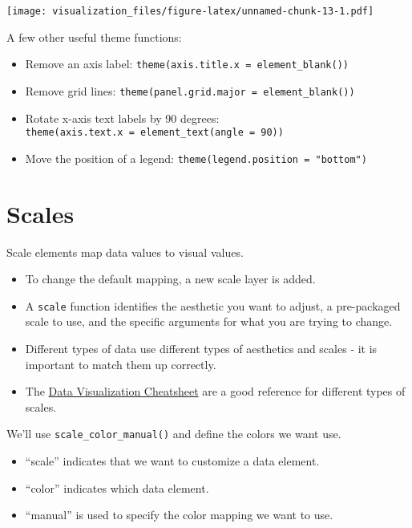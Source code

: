 \documentclass[oneside]{memoir}
\theoremstyle{definition}
\theoremstyle{definition}
\theoremstyle{definition}
\theoremstyle{remark}
\begin{document}
\texttt{[image: visualization\_files/figure-latex/unnamed-chunk-13-1.pdf]}

A few other useful theme functions:

\begin{itemize}
\item
  Remove an axis label:
  \texttt{theme(axis.title.x\ =\ element\_blank())}
\item
  Remove grid lines:
  \texttt{theme(panel.grid.major\ =\ element\_blank())}
\item
  Rotate x-axis text labels by 90 degrees:
  \texttt{theme(axis.text.x\ =\ element\_text(angle\ =\ 90))}
\item
  Move the position of a legend:
  \texttt{theme(legend.position\ =\ "bottom")}
\end{itemize}

\section{Scales}\label{scales}

Scale elements map data values to visual values.

\begin{itemize}
\item
  To change the default mapping, a new scale layer is added.
\item
  A \texttt{scale} function identifies the aesthetic you want to adjust,
  a pre-packaged scale to use, and the specific arguments for what you
  are trying to change.
\item
  Different types of data use different types of aesthetics and scales -
  it is important to match them up correctly.
\item
  The \href{https://www.rstudio.com/resources/cheatsheets}{Data
  Visualization Cheatsheet} are a good reference for different types of
  scales.
\end{itemize}

We'll use \texttt{scale\_color\_manual()} and define the colors we want
use.

\begin{itemize}
\item
  ``scale'' indicates that we want to customize a data element.
\item
  ``color'' indicates which data element.
\item
  ``manual'' is used to specify the color mapping we want to use.
\end{itemize}
\end{document}
